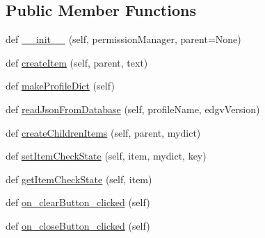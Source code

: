 \subsection*{Public Member Functions}
\begin{DoxyCompactItemize}
\item 
def \mbox{\hyperlink{class_dsg_tools_1_1_user_tools_1_1server_profiles_manager_1_1_server_profiles_manager_a35d99ae3a078b3252950e8c5ed177cad}{\+\_\+\+\_\+init\+\_\+\+\_\+}} (self, permission\+Manager, parent=None)
\item 
def \mbox{\hyperlink{class_dsg_tools_1_1_user_tools_1_1server_profiles_manager_1_1_server_profiles_manager_a3c318acd57bf18439cb0c88c57d5d4d9}{create\+Item}} (self, parent, text)
\item 
def \mbox{\hyperlink{class_dsg_tools_1_1_user_tools_1_1server_profiles_manager_1_1_server_profiles_manager_aad84d9e38d3a08eb25942bacd8c15136}{make\+Profile\+Dict}} (self)
\item 
def \mbox{\hyperlink{class_dsg_tools_1_1_user_tools_1_1server_profiles_manager_1_1_server_profiles_manager_a55aa853f110f1aa87039275c0380d8d7}{read\+Json\+From\+Database}} (self, profile\+Name, edgv\+Version)
\item 
def \mbox{\hyperlink{class_dsg_tools_1_1_user_tools_1_1server_profiles_manager_1_1_server_profiles_manager_a3da7f45f260e65c5f6afcde0b3a557f9}{create\+Children\+Items}} (self, parent, mydict)
\item 
def \mbox{\hyperlink{class_dsg_tools_1_1_user_tools_1_1server_profiles_manager_1_1_server_profiles_manager_a9f7d36e48d6eb2493d1e091cd9656658}{set\+Item\+Check\+State}} (self, item, mydict, key)
\item 
def \mbox{\hyperlink{class_dsg_tools_1_1_user_tools_1_1server_profiles_manager_1_1_server_profiles_manager_a8ba7fe7746fabee4c8b4f726c063e1f0}{get\+Item\+Check\+State}} (self, item)
\item 
def \mbox{\hyperlink{class_dsg_tools_1_1_user_tools_1_1server_profiles_manager_1_1_server_profiles_manager_ae57c52cca6ff6868a27dabc60808cd14}{on\+\_\+clear\+Button\+\_\+clicked}} (self)
\item 
def \mbox{\hyperlink{class_dsg_tools_1_1_user_tools_1_1server_profiles_manager_1_1_server_profiles_manager_a763bbc1efad90efa1b5aba9de2251002}{on\+\_\+close\+Button\+\_\+clicked}} (self)
\item 
\mbox{\label{class_dsg_tools_1_1_user_tools_1_1server_profiles_manager_1_1_server_profiles_manager_af57da75d16c13a0ad27fdbc8cd3aee8c}} 

\end{DoxyCompactItemize}
